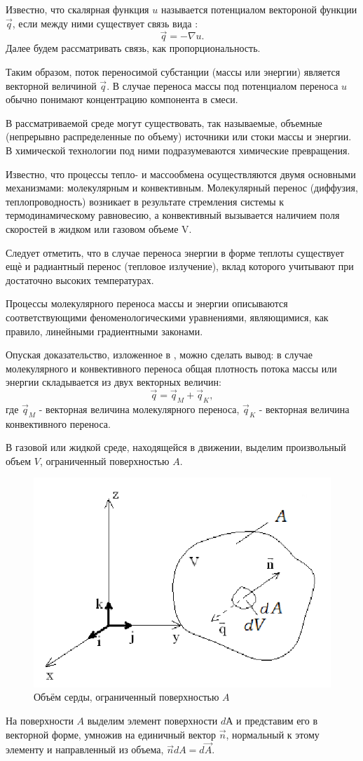 Известно, что скалярная функция $u$  называется потенциалом вектороной функции $\vec{q}$, если между ними существует связь вида \cite{Alonso1992}:
\[
	\vec{q} = - \nabla u.
\]
Далее будем рассматривать связь, как пропорциональность.

Таким образом, поток переносимой субстанции (массы или энергии) является
векторной величиной $\vec{q}$.
В случае переноса массы под потенциалом переноса
$u$ обычно понимают
концентрацию компонента в смеси.

В рассматриваемой среде могут существовать, так называемые, объемные
(непрерывно распределенные по объему) источники или стоки массы и энергии. 
В химической технологии под ними подразумеваются химические превращения.

Известно, что процессы тепло- и массообмена осуществляются двумя основными
механизмами: молекулярным и конвективным. Молекулярный перенос (диффузия,
теплопроводность) возникает в результате стремления системы к термодинамическому
равновесию, а конвективный вызывается наличием поля скоростей в жидком или газовом
объеме V.

Следует отметить, что в случае переноса энергии в форме теплоты существует ещѐ
и радиантный перенос (тепловое излучение), вклад которого учитывают при достаточно
высоких температурах.

Процессы молекулярного переноса массы и энергии описываются
соответствующими феноменологическими уравнениями, являющимися, как правило,
линейными градиентными законами.

Опуская доказательство, изложенное в  \cite{Alonso1992}, можно сделать вывод:
в случае молекулярного и конвективного переноса общая
плотность потока массы или энергии складывается из двух векторных величин:
\[ \vec{q} = \vec{q}_{M} + \vec{q}_{K},\]
где $ \vec{q}_{M} $ - векторная величина молекулярного переноса, $ \vec{q}_{K} $ - векторная величина конвективного переноса.

В газовой или жидкой среде, находящейся в движении, выделим произвольный
объем $V$, ограниченный поверхностью $A$.
\begin{figure}[h]  %
	\centering
	\includegraphics[height=0.5\textwidth]{imgs/area.png}  %
	\caption{Объём серды, ограниченный поверхностью $A$}  %
	\label{fig:area}  %
\end{figure}
На поверхности $A$ выделим элемент
поверхности $dА$ и представим его в векторной форме, умножив на единичный вектор $\vec{n}$,
нормальный к этому элементу и направленный из объема, $\vec{n} dA = d\vec{A}$.

